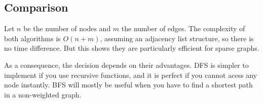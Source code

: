 \subsection{Comparison}

Let $n$ be the number of nodes and $m$ the number of edges.
The complexity of both algorithms is $O(n+m)$,
assuming an adjacency list structure, so there is no time difference.
But this shows they are particularly efficient for sparse graphs.

As a consequence, the decision depends on their advantages.
DFS is simpler to implement if you use recursive functions,
and it is perfect if you cannot acess any node instantly.
BFS will mostly be useful when you have to find a shortest path
in a non-weighted graph.
